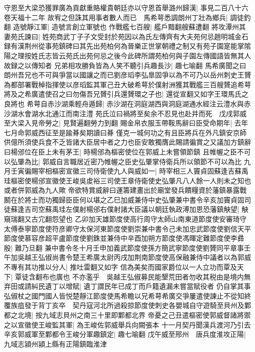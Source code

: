守恩至大梁恐獲罪廣為貢獻重賂權貴朝廷亦以守恩首舉潞州歸漢|{
	事見二百八十六卷天福十二年}
故宥之但誅其用事者數人而已　馬希萼悉調朗州丁壯為鄉兵|{
	調徒釣翻}
造號靜江軍|{
	造號言創立軍號也}
作戰艦七百艘|{
	艦戶黯翻艘蘇遭翻}
將攻潭州其妻苑氏諫曰|{
	姓苑商武丁子子文受封於苑因以為氏左傳齊有大夫苑何忌趙明城金石録有漢荆州從事苑鎮碑曰其先出苑柏何為晉樂正世掌朝禮之制又有苑子園寔能掌隂陽之理按姓氏志皆云苑氏出苑何忌之後今此碑所謂苑柏何與子園左傳國語皆無其人故録之以傳知者}
兄弟相攻勝負皆為人笑不聽引兵趣長沙|{
	趣七喻翻}
馬希廣聞之曰朗州吾兄也不可與爭當以國讓之而已劉彦瑫李弘臯固爭以為不可乃以岳州刺史王贇為都部署戰棹指揮使以彦瑫監其軍己丑大破希萼於僕射洲獲其戰艦三百艘贇追希萼將及之希廣遣使召之曰勿傷吾兄贇引兵還贇環之子也|{
	還從宣翻又如字王環馬氏之良將也}
希萼自赤沙湖乘輕舟遁歸|{
	赤沙湖在洞庭湖西與洞庭湖通水經注云澧水與赤沙湖水會湖水北通江而南注澧}
苑氏泣曰禍將至矣余不忍見也赴井而死　戊戌郭威至大梁入見帝勞之|{
	見賢遍翻勞力到翻}
賜金帛衣服玉帶鞍馬辭曰臣受命期年|{
	去年七月命郭威西征至是踰朞矣期讀曰朞}
僅克一城何功之有且臣將兵在外凡鎮安京師供億所須使兵食不乏皆諸大臣居中者之力也臣安敢獨膺此賜請徧賞之又議加方鎮辭曰楊邠位在臣上未有茅王|{
	時楊邠為樞密使位在郭威上未嘗領節鎮}
且帷幄之臣不可以弘肇為比|{
	郭威自言職居近密乃帷幄之臣史弘肇掌侍衛兵所以領節不可以為比}
九月壬寅徧賜宰相樞密宣徽三司侍衛使九人與威如一|{
	時宰相三人竇貞固蘇逢吉蘇禹珪樞密使楊邠宣徽使王峻吳䖍裕三司使王章侍衛使史弘肇凡八人餘一人則未之知也或者併郭威為九人歟}
帝欲特賞威辭曰運籌建畫出於廟堂發兵饋糧資於藩鎮暴露戰鬭在於將士而功獨歸臣臣何以堪之乙巳加威兼侍中史弘肇兼中書令辛亥加竇貞固司徒蘇逢吉司空蘇禹珪左僕射楊邠右僕射諸大臣議以朝廷執政溥加恩恐藩鎮觖望|{
	觖窺瑞翻又古宂翻怨望也}
乙卯加天雄節度使高行周守太師山南東道節度使安審琦守太傅泰寧節度使符彦卿守太保河東節度使劉崇兼中書令己未加忠武節度使劉信天平節度使慕容彦超平盧節度使劉銖並兼侍中辛酉加朔方節度使馮暉定難節度使李彞殷|{
	難乃旦翻}
兼中書令冬十月壬申加義武節度使孫方簡武寧節度使劉贇同平章事壬午加吳越王弘俶尚書令楚王希廣太尉丙戌加荆南節度使高保融兼侍中議者以為郭威不專有其功推以分人|{
	推吐雷翻又如字}
信為美矣而國家爵位以一人立功而覃及天下|{
	覃徒含翻布也廣也}
不亦濫乎　吳越王弘俶募民能墾荒田者勿收其税由是境内無弃田或請糾民遺丁以增賦|{
	遺丁謂民年已成丁而戶籍遺漏未嘗當賦役者}
仍自掌其事弘俶杖之國門國人皆悦楚靜江節度使馬希瞻以兄希萼希廣交爭屢遣使諫止不從知終覆族疽發于背丁亥卒　契丹寇河北所過殺掠節度使刺史各嬰城自守遊騎至貝州及鄴都之北境|{
	按九域志貝州之南三十里即鄴都北界}
帝憂之己丑遣樞密使郭威督諸將禦之以宣徽使王峻監其軍|{
	為王峻佐郭威舉兵向闕張本}
十一月契丹聞漢兵渡河乃引去辛亥郭威軍至鄴都令王峻分軍趣鎮定|{
	趣七喻翻}
戊午威至邢州　唐兵度淮攻正陽|{
	九域志潁州潁上縣有正陽鎮臨淮津}
